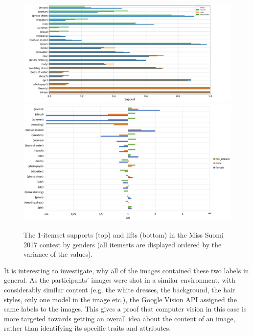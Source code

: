 \begin{figure}[]
    \begin{center}
        \includegraphics[width=1.2\textwidth,center]{Images/itemset_supports-gender-Miss_Helsinki-1_itemset.png} 
        \includegraphics[width=1.2\textwidth,center]{Images/itemset_lifts-gender-Miss_Suomi-1_itemsets.png}
        \caption{The 1-itemset supports (top) and lifts (bottom) in the Miss Suomi 2017 contest by genders (all itemsets are displayed ordered by the variance of the values).}
        \label{itemset_supports-gender-Miss_Helsinki-1_itemset}
    \end{center}
\end{figure}

It is interesting to investigate, why all of the images contained these two labels in general. As the participants' images were shot in a similar environment, with considerably similar content (e.g. the white dresses, the background, the hair styles, only one model in the image etc.), the Google Vision API assigned the same labels to the images. This gives a proof that computer vision in this case is more targeted towards getting an overall idea about the content of an image, rather than identifying its specific traits and attributes. 

